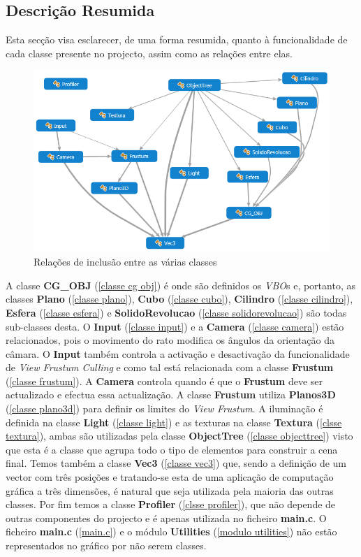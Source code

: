 \documentclass[a5paper,onecolumn, 11pt]{article}
\begin{document}
\subsection{Descrição Resumida}
Esta secção visa esclarecer, de uma forma resumida, quanto à funcionalidade de cada classe presente no projecto, assim como as relações entre elas. 
\begin{figure}[!htb]
    \centering
    \includegraphics[scale=0.6]{dependencias.png}
    \caption{Relações de inclusão entre as várias classes}
\end{figure}

\clearpage
A classe \textbf{CG\_OBJ} (\ref{classe cg obj}) é onde são definidos os \textit{VBO}s e, portanto, as classes \textbf{Plano} (\ref{classe plano}), \textbf{Cubo} (\ref{classe cubo}), \textbf{Cilindro} (\ref{classe cilindro}), \textbf{Esfera} (\ref{classe esfera}) e \textbf{SolidoRevolucao} (\ref{classe solidorevolucao}) são todas sub-classes desta. O \textbf{Input} (\ref{classe input}) e a \textbf{Camera} (\ref{classe camera}) estão relacionados, pois o movimento do rato modifica os ângulos da orientação da câmara. O \textbf{Input} também controla a activação e desactivação da funcionalidade de \textit{View Frustum Culling} e como tal está relacionada com a classe \textbf{Frustum} (\ref{classe frustum}). A \textbf{Camera} controla quando é que o \textbf{Frustum} deve ser actualizado e efectua essa actualização. A classe \textbf{Frustum} utiliza \textbf{Planos3D} (\ref{classe plano3d}) para definir os limites do \textit{View Frustum}. A iluminação é definida na classe \textbf{Light} (\ref{classe light}) e as texturas na classe \textbf{Textura} (\ref{clsse textura}), ambas são utilizadas pela classe \textbf{ObjectTree} (\ref{classe objecttree}) visto que esta é a classe que agrupa todo o tipo de elementos para construir a cena final. Temos também a classe \textbf{Vec3} (\ref{classe vec3}) que, sendo a definição de um vector com três posições e tratando-se esta de uma aplicação de computação gráfica a três dimensões, é natural que seja utilizada pela maioria das outras classes. Por fim temos a classe \textbf{Profiler} (\ref{clsse profiler}), que não depende de outras componentes do projecto e é apenas utilizada no ficheiro \textbf{main.c}. O ficheiro \textbf{main.c} (\ref{main.c}) e o módulo \textbf{Utilities} (\ref{modulo utilities}) não estão representados no gráfico por não serem classes.
\end{document}
